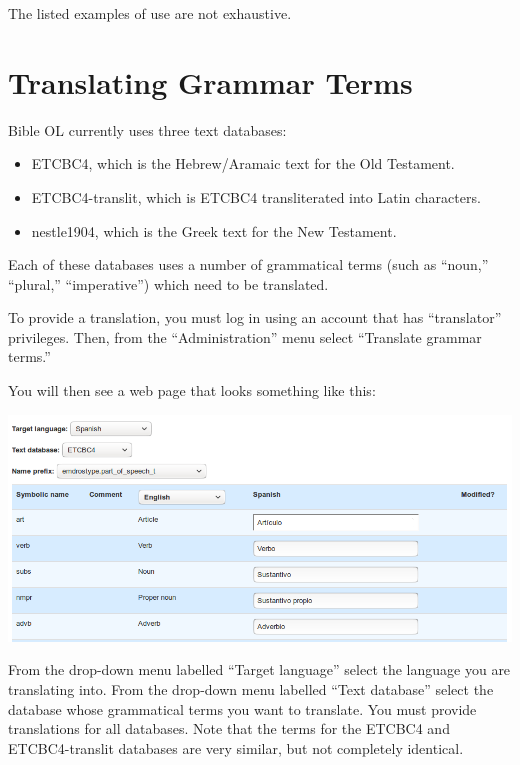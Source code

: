 \documentclass[11pt,oneside,a4paper]{memoir}
\begin{document}
The listed examples of use are not exhaustive.


\chapter{Translating Grammar Terms}

Bible OL currently uses three text databases:

\begin{itemize}
\item ETCBC4, which is the Hebrew/Aramaic text for the Old Testament.
\item ETCBC4-translit, which is ETCBC4 transliterated into Latin characters.
\item nestle1904, which is the Greek text for the New Testament.
\end{itemize}

Each of these databases uses a number of grammatical terms (such as ``noun,'' ``plural,''
``imperative'') which need to be translated.

To provide a translation, you must log in using an account that has ``translator'' privileges. Then,
from the ``Administration'' menu select ``Translate grammar terms.''

You will then see a web page that looks something like this:

\begin{center}
  \includegraphics[width=0.9\linewidth]{grammar.png}
\end{center}

From the drop-down menu labelled ``Target language'' select the language you are translating into.
From the drop-down menu labelled ``Text database'' select the database whose grammatical terms you
want to translate. You must provide translations for all databases. Note that the terms for the
ETCBC4 and ETCBC4-translit databases are very similar, but not completely identical.
\end{document}
